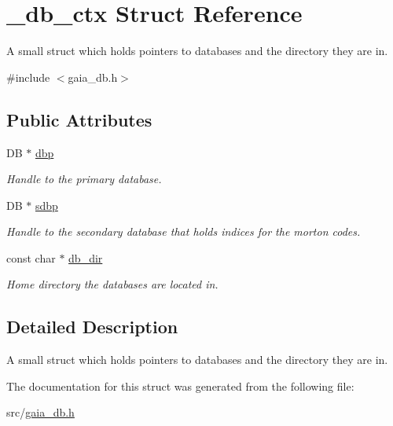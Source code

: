 \hypertarget{struct__db__ctx}{}\section{\+\_\+db\+\_\+ctx Struct Reference}
\label{struct__db__ctx}


A small struct which holds pointers to databases and the directory they are in.  




{\ttfamily \#include $<$gaia\+\_\+db.\+h$>$}

\subsection*{Public Attributes}
\begin{DoxyCompactItemize}
\item 
\mbox{\label{struct__db__ctx_a0ff642d9584a191613fa5aa0bf6c1517}} 
DB $\ast$ \mbox{\hyperlink{struct__db__ctx_a0ff642d9584a191613fa5aa0bf6c1517}{dbp}}
\begin{DoxyCompactList}\small\item\em Handle to the primary database. \end{DoxyCompactList}\item 
\mbox{\label{struct__db__ctx_ac2d1ca553302f173bd7d5f7bcf410b17}} 
DB $\ast$ \mbox{\hyperlink{struct__db__ctx_ac2d1ca553302f173bd7d5f7bcf410b17}{sdbp}}
\begin{DoxyCompactList}\small\item\em Handle to the secondary database that holds indices for the morton codes. \end{DoxyCompactList}\item 
\mbox{\label{struct__db__ctx_a137ad2d480f425c2c28b227f96d347c3}} 
const char $\ast$ \mbox{\hyperlink{struct__db__ctx_a137ad2d480f425c2c28b227f96d347c3}{db\+\_\+dir}}
\begin{DoxyCompactList}\small\item\em Home directory the databases are located in. \end{DoxyCompactList}\end{DoxyCompactItemize}


\subsection{Detailed Description}
A small struct which holds pointers to databases and the directory they are in. 

The documentation for this struct was generated from the following file\+:\begin{DoxyCompactItemize}
\item 
src/\mbox{\hyperlink{gaia__db_8h}{gaia\+\_\+db.\+h}}\end{DoxyCompactItemize}
